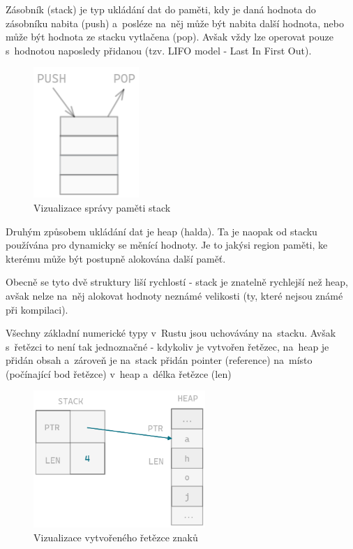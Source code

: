 \documentclass[a4paper, 12pt]{article} %
\begin{document}
            Zásobník (stack) je typ ukládání dat do paměti, kdy je daná hodnota do zásobníku nabita (push) a~posléze na~něj může být nabita další hodnota, nebo může být hodnota ze stacku vytlačena (pop). Avšak vždy lze operovat pouze s~hodnotou naposledy přidanou (tzv. LIFO model - Last In First Out).
            \begin{center}
                \begin{figure}[H]
                    \centering
                    \includegraphics[width=4cm]{stack}
                    \caption{Vizualizace správy paměti stack}
                    \label{fig:my_label_2}
                \end{figure}
            \end{center}
                
            Druhým způsobem ukládání dat je heap (halda). Ta je naopak od stacku používána pro dynamicky se měnící hodnoty. Je to jakýsi region paměti, ke kterému může být postupně alokována další paměť.
                
            Obecně se tyto dvě struktury liší rychlostí - stack je znatelně rychlejší než heap, avšak nelze na~něj alokovat hodnoty neznámé velikosti (ty, které nejsou známé při kompilaci).
                
            Všechny základní numerické typy v~Rustu jsou uchovávány na~stacku. Avšak s~řetězci to není tak jednoznačné - kdykoliv je vytvořen řetězec, na~heap je přidán obsah a~zároveň je na~stack přidán pointer (reference) na~místo (počínající bod řetězce) v~heap a~délka řetězce (len)
                
            \begin{center}
                \begin{figure}[H]
                    \centering
                    \includegraphics[width=6.5cm]{string_heap}
                    \caption{Vizualizace vytvořeného řetězce znaků}
                    \label{fig:my_label_3}
                \end{figure}
            \end{center}
                
\end{document}
